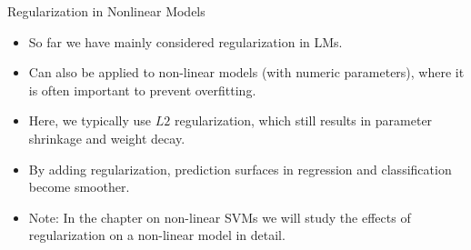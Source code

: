 \begin{vbframe}{Regularization in Nonlinear Models}

\begin{itemize}
  \item So far we have mainly considered regularization in LMs.
  \item Can also be applied to non-linear models (with numeric parameters), where it is 
  often important to prevent overfitting.
  \item Here, we typically use $L2$ regularization, which
      still results in parameter shrinkage and weight decay.
  \item By adding regularization, prediction surfaces in regression and 
  classification become smoother. 
  \item Note: In the chapter on non-linear SVMs we will study the effects of
  regularization on a non-linear model in detail. 
\end{itemize}

\end{vbframe}



